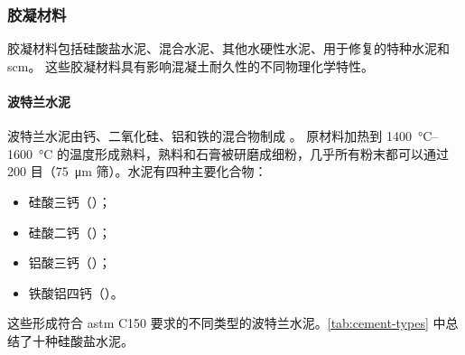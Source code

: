 \subsubsection{胶凝材料}
胶凝材料包括硅酸盐水泥、混合水泥、其他水硬性水泥、用于修复的特种水泥和\gls{scm}。 这些胶凝材料具有影响混凝土耐久性的不同物理化学特性。

\paragraph{波特兰水泥}
波特兰水泥由钙、二氧化硅、铝和铁的混合物制成 \cite{kosmatka2011d}。 原材料加热到 \qtyrange{1400}{1600}{\celsius} 的温度形成熟料，熟料和石膏被研磨成细粉，几乎所有粉末都可以通过 200 目（\qty{75}{\micro m} 筛）。水泥有四种主要化合物：
\begin{itemize}
  \item 硅酸三钙（）；
  \item 硅酸二钙（）；
  \item 铝酸三钙（）；
  \item 铁酸铝四钙（）。
\end{itemize}
这些形成符合 \acrshort*{astm} C150 要求的不同类型的波特兰水泥。\cref{tab:cement-types} 中总结了十种硅酸盐水泥。

